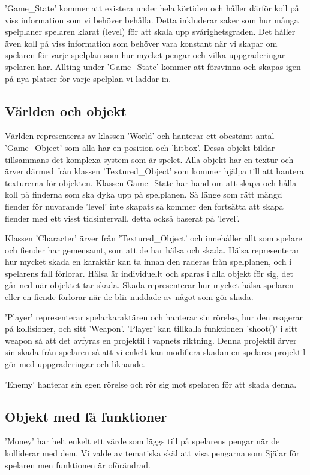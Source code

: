 \documentclass{TDP005mall}
\begin{document}
'Game\_State' kommer att existera under hela körtiden och håller därför koll på viss information som vi behöver behålla. Detta inkluderar saker som hur många spelplaner spelaren klarat (level) för att skala upp svårighetsgraden. Det håller även koll på viss information som behöver vara konstant när vi skapar om spelaren för varje spelplan som hur mycket pengar och vilka uppgraderingar spelaren har. Allting under 'Game\_State' kommer att försvinna och skapas igen på nya platser för varje spelplan vi laddar in.

\subsection{Världen och objekt}
Världen representeras av klassen 'World' och hanterar ett obestämt antal 'Game\_Object' som alla har en position och 'hitbox'. Dessa objekt bildar tillsammans det komplexa system som är spelet. Alla objekt har en textur och ärver därmed från klassen 'Textured\_Object' som kommer hjälpa till att hantera texturerna för objekten. Klassen Game\_State har hand om att skapa och hålla koll på finderna som ska dyka upp på spelplanen. Så länge som rätt mängd fiender för nuvarande 'level' inte skapats så kommer den fortsätta att skapa fiender med ett visst tidsintervall, detta också baserat på 'level'.

Klassen 'Character' ärver från 'Textured\_Object' och innehåller allt som spelare och fiender har gemensamt, som att de har hälsa och skada. Hälsa representerar hur mycket skada en karaktär kan ta innan den raderas från spelplanen, och i spelarens fall förlorar. Hälsa är individuellt och sparas i alla objekt för sig, det går ned när objektet tar skada. Skada representerar hur mycket hälsa spelaren eller en fiende förlorar när de blir nuddade av något som gör skada.

'Player' representerar spelarkaraktären och hanterar sin rörelse, hur den reagerar på kollisioner, och sitt 'Weapon'. 'Player' kan tillkalla funktionen 'shoot()' i sitt weapon så att det avfyras en projektil i vapnets riktning. Denna projektil ärver sin skada från spelaren så att vi enkelt kan modifiera skadan en spelares projektil gör med uppgraderingar och liknande.

'Enemy' hanterar sin egen rörelse och rör sig mot spelaren för att skada denna.

\subsection{Objekt med få funktioner}
'Money' har helt enkelt ett värde som läggs till på spelarens pengar när de kolliderar med dem. Vi valde av tematiska skäl att visa pengarna som Själar för spelaren men funktionen är oförändrad. 
\end{document}
